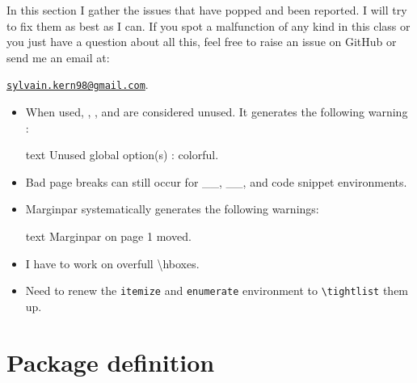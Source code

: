 \documentclass[
	a4paper,
	raggedright,
	twoside,
	12pt,
	colorful,
]{tufte-style-article}
\begin{document}
In this section I gather the issues that have popped and been reported. I will try to fix them as best as I can. If you spot a malfunction of any kind in this class or you just have a question about all this, feel free to raise an issue on GitHub or send me an email at:

\href{mailto:sylvain.kern98@gmail.com}{\texttt{sylvain.kern98@gmail.com}}.

\bigskip

\begin{itemize}\tightlist
\item When used, , , and  are considered unused. It generates the following warning :
\begin{codebox}{text}
Unused global option(s) : colorful.
\end{codebox}
\item Bad page breaks can still occur for _\textfig{}_, _\widefig{}_, and code snippet environments.
\item Marginpar systematically generates the following warnings:
\begin{codebox}{text}
Marginpar on page 1 moved.
\end{codebox}
\item I have to work on overfull \textbackslash hboxes.
\item Need to renew the \texttt{itemize} and \texttt{enumerate} environment to \texttt{\textbackslash tightlist} them up.
\end{itemize}


\section{Package definition}
\end{document}
